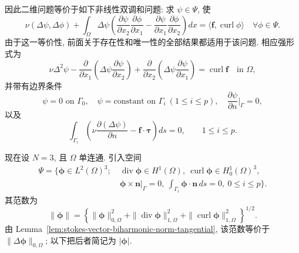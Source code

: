 因此二维问题等价于如下非线性双调和问题: 求 $\psi\in\Psi$, 使
\[
\nu(\Delta\psi,\Delta\phi)
+\int_\Omega\Delta\psi
\left(
\frac{\partial\psi}{\partial x_2}
\frac{\partial\phi}{\partial x_1}
-\frac{\partial\psi}{\partial x_1}
\frac{\partial\phi}{\partial x_2}
\right)dx
=\langle\mathbf f,\operatorname{curl}\phi\rangle
\quad\forall\phi\in\Psi.
\]
由于这一等价性, 前面关于存在性和唯一性的全部结果都适用于该问题.
相应强形式为
\[
\nu\Delta^2\psi
-\frac{\partial}{\partial x_1}
\left(\Delta\psi\frac{\partial\psi}{\partial x_2}\right)
+\frac{\partial}{\partial x_2}
\left(\Delta\psi\frac{\partial\psi}{\partial x_1}\right)
=\operatorname{curl}\mathbf f
\quad\text{in }\Omega,
\]
并带有边界条件
\[
\psi=0\text{ on }\Gamma_0,
\quad
\psi=\text{constant on }\Gamma_i\ (1\leq i\leq p),
\quad
\frac{\partial\psi}{\partial n}\bigg|_\Gamma=0,
\]
以及
\[
\int_{\Gamma_i}
\left(\nu\frac{\partial(\Delta\psi)}{\partial n}
-\mathbf f\cdot\boldsymbol\tau\right)ds=0,
\qquad1\leq i\leq p.
\]

现在设 $N=3$, 且 $\Omega$ 单连通. 引入空间
\[
\begin{aligned}
\Psi=\{\boldsymbol\phi\in L^2(\Omega)^3;\ &
\operatorname{div}\boldsymbol\phi\in H^1(\Omega),
\ \operatorname{curl}\boldsymbol\phi\in H_0^1(\Omega)^3,\\
&\boldsymbol\phi\times\mathbf n|_\Gamma=0,
\ \int_{\Gamma_i}\boldsymbol\phi\cdot\mathbf n\,ds=0,
\ 0\leq i\leq p\}.
\end{aligned}
\]
其范数为
\[
\|\boldsymbol\phi\|
=\left\{\|\boldsymbol\phi\|_{0,\Omega}^2
+\|\operatorname{div}\boldsymbol\phi\|_{1,\Omega}^2
+\|\operatorname{curl}\boldsymbol\phi\|_{1,\Omega}^2\right\}^{1/2}.
\]
由 Lemma~\ref{lem:stokes-vector-biharmonic-norm-tangential}, 该范数等价于
$\|\Delta\boldsymbol\phi\|_{0,\Omega}$; 以下把后者简记为
$|\boldsymbol\phi|$.

